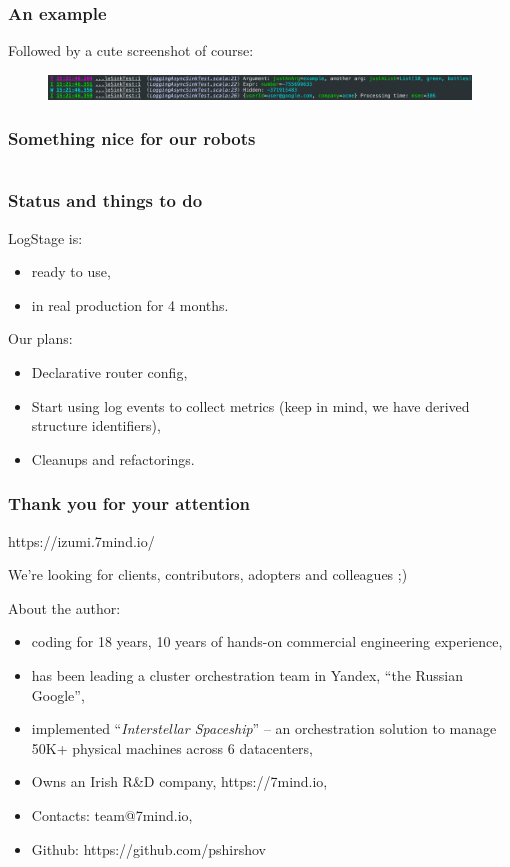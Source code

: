 \documentclass[usenames,dvipsnames]{beamer}
\begin{document}
\begin{frame}
\frametitle{An example}
Followed by a cute screenshot of course:
\begin{figure}
    \includegraphics[width=\textwidth]{media/logstage-console.png}
\end{figure}
\end{frame}

\begin{frame}
\frametitle{Something nice for our robots}
\begin{figure}
    \inputminted[fontsize=\scriptsize]{json}{target/ex-json-out.tmp}
\end{figure}
\end{frame}

\begin{frame}
\frametitle{Status and things to do}
LogStage is:
\begin{itemize}
\item ready to use,
\item in real production for 4 months.
\end{itemize}
\vspace{0.3cm}
Our plans:
\begin{itemize}
\item Declarative router config,
\item Start using log events to collect metrics (keep in mind, we have derived structure identifiers),
\item Cleanups and refactorings.
\end{itemize}
\end{frame}

\begin{frame}
    \frametitle{Thank you for your attention}

    \begin{center}
      https://izumi.7mind.io/

      We're looking for clients, contributors, adopters and colleagues ;)
    \end{center}

    About the author:
    \begin{itemize}
        \item coding for 18 years, 10 years of hands-on commercial engineering experience,
        \item has been leading a cluster orchestration team in Yandex, ``the Russian Google'',
        \item implemented ``\textit{Interstellar Spaceship}'' -- an orchestration solution to manage 50K+ physical machines across 6 datacenters,
        \item Owns an Irish R\&D company, https://7mind.io,
        \item Contacts: team@7mind.io,
        \item Github: https://github.com/pshirshov
    \end{itemize}
\end{frame}
\end{document}
